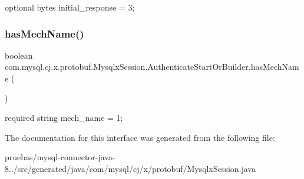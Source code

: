 {\ttfamily optional bytes initial\+\_\+response = 3;} \mbox{\label{interfacecom_1_1mysql_1_1cj_1_1x_1_1protobuf_1_1_mysqlx_session_1_1_authenticate_start_or_builder_a6885f3f6e61f2efd84bc1b8ee567344d}} 
\subsubsection{\texorpdfstring{has\+Mech\+Name()}{hasMechName()}}
{\footnotesize\ttfamily boolean com.\+mysql.\+cj.\+x.\+protobuf.\+Mysqlx\+Session.\+Authenticate\+Start\+Or\+Builder.\+has\+Mech\+Name (\begin{DoxyParamCaption}{ }\end{DoxyParamCaption})}

{\ttfamily required string mech\+\_\+name = 1;} 

The documentation for this interface was generated from the following file\+:\begin{DoxyCompactItemize}
\item 
pruebas/mysql-\/connector-\/java-\/8../src/generated/java/com/mysql/cj/x/protobuf/Mysqlx\+Session.\+java\end{DoxyCompactItemize}
